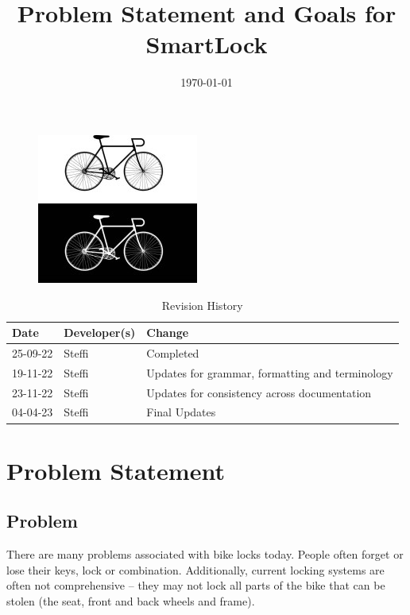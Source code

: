 \documentclass{article}
\title{Problem Statement and Goals for SmartLock\\\progname}
\author{\authname}
\date{\today}
\begin{document}




\maketitle
\thispagestyle{empty}
\begin{figure}[h!]
  \centering
  \includegraphics[width=0.4\linewidth]{../BikeLogo.jpg}
\end{figure}

\newpage
{}
\begin{table}[hp]
\caption{Revision History} \label{TblRevisionHistory}
\begin{tabularx}{\textwidth}{llX}
\toprule
\textbf{Date} & \textbf{Developer(s)} & \textbf{Change}\\
\midrule
25-09-22 & Steffi & Completed\\
19-11-22 & Steffi & Updates for grammar, formatting and terminology\\
23-11-22 & Steffi & Updates for consistency across documentation\\
04-04-23 & Steffi & Final Updates\\
\bottomrule
\end{tabularx}
\end{table}

\newpage
\tableofcontents
\listoftables

\newpage
{}
\section{Problem Statement}

\subsection{Problem}

There are many problems associated with bike locks today.  People often forget or lose their keys, lock or combination.  Additionally, current locking systems are often not comprehensive – they may not lock all parts of the bike that can be stolen (the seat, front and back wheels and frame). 
\end{document}
